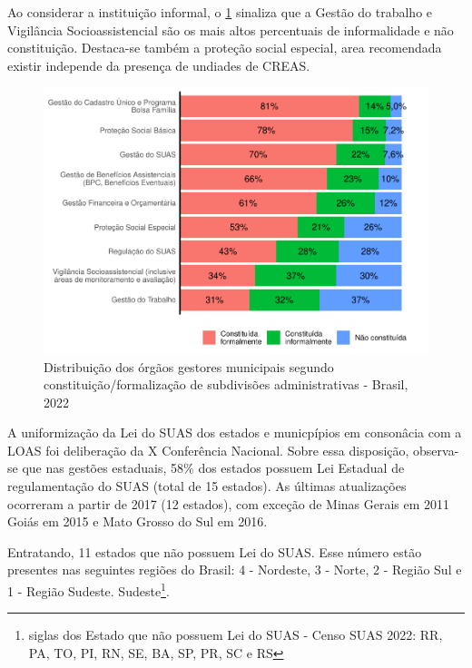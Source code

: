\documentclass[
  brazilian]{report}
\begin{document}
Ao considerar a instituição informal, o
\cref{fig:municipais-constituicao-subdivisoes} sinaliza que a Gestão do
trabalho e Vigilância Socioassistencial são os mais altos percentuais de
informalidade e não constituição. Destaca-se também a proteção social
especial, area recomendada existir independe da presença de undiades de
CREAS.

\begin{figure}
\includegraphics{Censo-SUAS-2022_files/figure-latex/municipais-constituicao-subdivisoes-1} \caption[Distribuição dos órgãos gestores municipais segundo constituição/formalização de subdivisões administrativas - Brasil, 2022]{Distribuição dos órgãos gestores municipais segundo constituição/formalização de subdivisões administrativas - Brasil, 2022}\label{fig:municipais-constituicao-subdivisoes}
\end{figure}

A uniformização da Lei do SUAS dos estados e municpípios em consonâcia
com a LOAS foi deliberação da X Conferência Nacional. Sobre essa
disposição, observa-se que nas gestões estaduais, 58\% dos estados
possuem Lei Estadual de regulamentação do SUAS (total de 15 estados). As
últimas atualizações ocorreram a partir de 2017 (12 estados), com
exceção de Minas Gerais em 2011 Goiás em 2015 e Mato Grosso do Sul em
2016.

Entratando, 11 estados que não possuem Lei do SUAS. Esse número estão
presentes nas seguintes regiões do Brasil: 4 - Nordeste, 3 - Norte, 2 -
Região Sul e 1 - Região Sudeste.
Sudeste\footnote{ siglas dos Estado que não possuem Lei do SUAS - Censo SUAS 2022: RR, PA, TO, PI, RN, SE, BA, SP, PR, SC e RS}.
\end{document}
